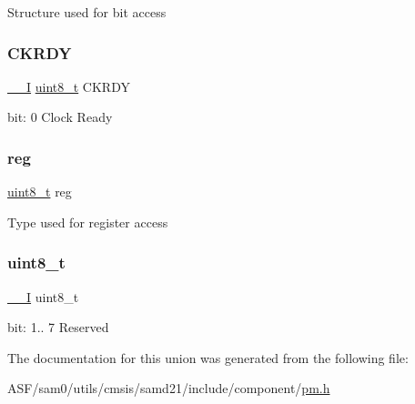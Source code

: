 Structure used for bit access \mbox{\label{union_p_m___i_n_t_f_l_a_g___type_a65802f74418a208c4e0d108d6e884c95}} 
\subsubsection{\texorpdfstring{CKRDY}{CKRDY}}
{\footnotesize\ttfamily \mbox{\hyperlink{core__cm0plus_8h_af63697ed9952cc71e1225efe205f6cd3}{\+\_\+\+\_\+I}} \mbox{\hyperlink{union_p_m___i_n_t_f_l_a_g___type_a5b4208c6f4c4a4290c4f2804d1eb1d5b}{uint8\+\_\+t}} C\+K\+R\+DY}

bit\+: 0 Clock Ready \mbox{\label{union_p_m___i_n_t_f_l_a_g___type_a9428adc9af4653a2050e2536b55dec8d}} 
\subsubsection{\texorpdfstring{reg}{reg}}
{\footnotesize\ttfamily \mbox{\hyperlink{union_p_m___i_n_t_f_l_a_g___type_a5b4208c6f4c4a4290c4f2804d1eb1d5b}{uint8\+\_\+t}} reg}

Type used for register access \mbox{\label{union_p_m___i_n_t_f_l_a_g___type_a5b4208c6f4c4a4290c4f2804d1eb1d5b}} 
\subsubsection{\texorpdfstring{uint8\_t}{uint8\_t}}
{\footnotesize\ttfamily \mbox{\hyperlink{core__cm0plus_8h_af63697ed9952cc71e1225efe205f6cd3}{\+\_\+\+\_\+I}} uint8\+\_\+t}

bit\+: 1.. 7 Reserved 

The documentation for this union was generated from the following file\+:\begin{DoxyCompactItemize}
\item 
A\+S\+F/sam0/utils/cmsis/samd21/include/component/\mbox{\hyperlink{component_2pm_8h}{pm.\+h}}\end{DoxyCompactItemize}
